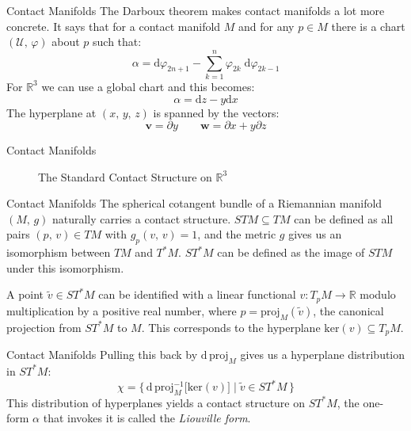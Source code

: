 \documentclass{beamer}
\begin{document}
    \begin{frame}{Contact Manifolds}
        The Darboux theorem makes contact manifolds a lot more concrete. It says
        that for a contact manifold $M$ and for any $p\in{M}$ there is a chart
        $(\mathcal{U},\,\varphi)$ about $p$ such that:
        \begin{equation}
            \alpha=\textrm{d}\varphi_{2n+1}-
                \sum_{k=1}^{n}\varphi_{2k}\;\textrm{d}\varphi_{2k-1}
        \end{equation}
        For $\mathbb{R}^{3}$ we can use a global chart and this becomes:
        \begin{equation}
            \alpha=\textrm{d}z-y\textrm{d}x
        \end{equation}
        The hyperplane at $(x,\,y,\,z)$ is spanned by the vectors:
        \begin{equation}
            \mathbf{v}=\partial{y}\quad\quad\mathbf{w}=\partial{x}+y\partial{z}
        \end{equation}
    \end{frame}
    \begin{frame}{Contact Manifolds}
        \begin{figure}
            \centering
            \caption{The Standard Contact Structure on $\mathbb{R}^{3}$}
            \label{fig:contact_on_r3}
        \end{figure}
    \end{frame}
    \begin{frame}{Contact Manifolds}
        The spherical cotangent bundle of a Riemannian manifold $(M,\,g)$
        naturally carries a contact structure. $STM\subseteq{TM}$ can be
        defined as all pairs $(p,\,v)\in{TM}$ with $g_{p}(v,\,v)=1$, and the
        metric $g$ gives us an isomorphism between $TM$ and $T^{*}M$. $ST^{*}M$
        can be defined as the image of $STM$ under this isomorphism.
        \par\hfill\par
        A point $\tilde{v}\in{ST}^{*}M$ can be identified with a linear
        functional $v:T_{p}M\rightarrow\mathbb{R}$ modulo multiplication by a
        positive real number, where $p=\textrm{proj}_{M}(\tilde{v})$, the
        canonical projection from $ST^{*}M$ to $M$. This corresponds to the
        hyperplane $\textrm{ker}(v)\subseteq{T}_{p}M$.
    \end{frame}
    \begin{frame}{Contact Manifolds}
        Pulling this back by $\textrm{d}\,\textrm{proj}_{M}$ gives us a
        hyperplane distribution in $ST^{*}M$:
        \begin{equation}
            \chi=\{\,\textrm{d}\,
                \textrm{proj}_{M}^{-1}\big[\textrm{ker}(v)\big]\;|\;
                    \tilde{v}\in{S}T^{*}M\,\}
        \end{equation}
        This distribution of hyperplanes yields a contact structure on
        $ST^{*}M$, the one-form $\alpha$ that invokes it is called the
        \textit{Liouville form}.
    \end{frame}
\end{document}
